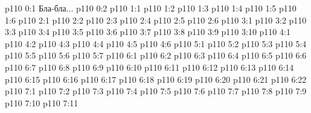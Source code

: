 \author{Одиночный Посланник}
\vs p110 0:1  Бла-бла...
\vs p110 0:2 
\vs p110 1:1 
\vs p110 1:2 
\vs p110 1:3 
\vs p110 1:4 \pc 
\vs p110 1:5 
\vs p110 1:6 \pc 
{}
\vs p110 2:1 
\vs p110 2:2 
\vs p110 2:3 \pc 
\vs p110 2:4 
\vs p110 2:5 \pc 
\vs p110 2:6 
\vs p110 3:1 
\vs p110 3:2 
\vs p110 3:3 
\vs p110 3:4 \pc 
\vs p110 3:5 \pc 
\vs p110 3:6 
\vs p110 3:7 
\vs p110 3:8 
\vs p110 3:9 
\vs p110 3:10 
\vs p110 4:1 
\vs p110 4:2 
\vs p110 4:3 
\vs p110 4:4 
\vs p110 4:5 \pc 
\vs p110 4:6 
\vs p110 5:1 
\vs p110 5:2 \pc 
\vs p110 5:3 
\vs p110 5:4 
\vs p110 5:5 
\vs p110 5:6 
\vs p110 5:7 \pc 
{}
\vs p110 6:1 
\vs p110 6:2 
\vs p110 6:3 \pc 
\vs p110 6:4 
\vs p110 6:5 \pc 
\vs p110 6:6 \pc 
\vs p110 6:7 
\vs p110 6:8 
\vs p110 6:9 
\vs p110 6:10 
\vs p110 6:11 \pc 
\vs p110 6:12 
\vs p110 6:13 \pc 
\vs p110 6:14 \pc 
\vs p110 6:15 \pc 
\vs p110 6:16 \pc 
\vs p110 6:17 
\vs p110 6:18 
\vs p110 6:19 
\vs p110 6:20 
\vs p110 6:21 \pc 
\vs p110 6:22 
\vs p110 7:1 
\vs p110 7:2 
\vs p110 7:3 
\vs p110 7:4 \pc 
\vs p110 7:5 
\vs p110 7:6 \pc 
\vs p110 7:7 
\vs p110 7:8 
\vs p110 7:9 
\vs p110 7:10 \pc 
\vsetoff
\vs p110 7:11 
\quizlink
